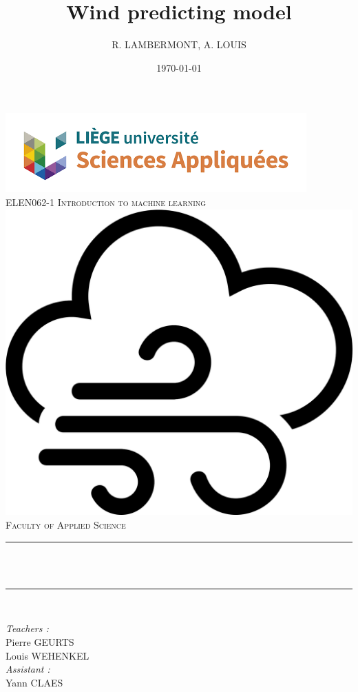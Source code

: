 \title{Wind predicting model}								%
\author{R. LAMBERMONT, A. LOUIS}								%
\date{\today}											%

\makeatletter
\let\thetitle\@title
\let\theauthor\@author
\let\thedate\@date
\makeatother

\pagestyle{fancy}
\fancyhf{}
\rhead{\theauthor}
\lhead{\thetitle}
\cfoot{\thepage}

\begin{titlepage}
 \centering
 \vspace*{0.5 cm}
 \includegraphics[scale = 0.7]{figs/facsa.png}\\[1.0 cm]	%
 \textsc{\Large ELEN062-1 Introduction to machine learning}\\[1.5 cm]	%
 \includegraphics*[width=.3\textwidth]{figs/wind.png}\\[1.5 cm]
 \textsc{\LARGE \newline\newline Faculty of Applied Science}\\[0.5 cm]				%
 \rule{\linewidth}{0.2 mm} \\[0.4 cm]
 {\huge \bfseries \thetitle}\\
 \rule{\linewidth}{0.2 mm} \\[1.5 cm]

 \begin{minipage}{0.5\textwidth}
 	\begin{flushleft} \large
 		\emph{Teachers :}\\
 		Pierre GEURTS\\
    Louis WEHENKEL\\
    \vspace{0.5cm}
    \emph{Assistant :}\\
    Yann CLAES\\
 		\end{flushleft}
 		\end{minipage}~
 		\begin{minipage}{0.4\textwidth}


\end{minipage}
\end{titlepage}
